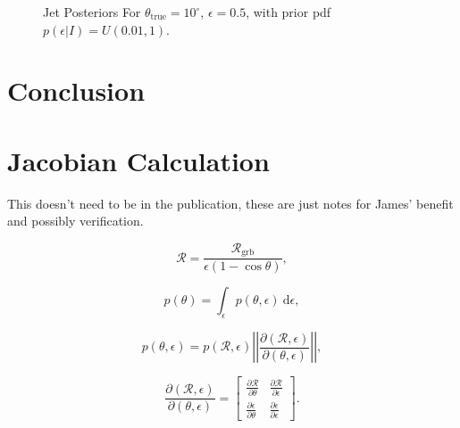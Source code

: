 \documentclass[twocolumn,nofootinbib]{revtex4-1}
\newcommand{\grbrate}{{{\mathcal R}_{\mathrm{grb}}}}
\newcommand{\cbcrate}{{{\mathcal R}}}
\newcommand{\diff}{{\mathrm d}}
\begin{document}
\begin{figure}%
\centering
\caption{Jet Posteriors For $\theta_{\mathrm{true}} = 10^{\circ}$,
$\epsilon=0.5$, with prior pdf $p(\epsilon|I) = U(0.01,1)$.}
\end{figure}


\section{Conclusion}

\appendix
\section{Jacobian Calculation}
This doesn't need to be in the publication, these are just notes for James'
benefit and possibly verification.

\begin{equation}
\cbcrate=\frac{\grbrate}{\epsilon(1-\cos \theta)},
\end{equation}

\begin{equation}
p(\theta) = \int_{\epsilon} p(\theta,\epsilon)~\diff \epsilon,
\end{equation}

\begin{equation}
p(\theta,\epsilon) = p(\cbcrate,\epsilon)
\left\lvert\left\lvert
\frac{\partial(\cbcrate,\epsilon)}{\partial(\theta,\epsilon)}
\right\rvert\right\rvert,
\end{equation}

\begingroup
\renewcommand*{\arraystretch}{1.5}

\begin{equation}
\frac{\partial (\cbcrate,\epsilon)}{\partial(\theta,\epsilon)} =
\begin{bmatrix}
\frac{\partial \cbcrate}{\partial \theta} & \frac{\partial \cbcrate}{\partial \epsilon} \\
\frac{\partial \epsilon}{\partial \theta} & \frac{\partial \epsilon}{\partial \epsilon}
\end{bmatrix}.
\end{equation}
\end{document}
